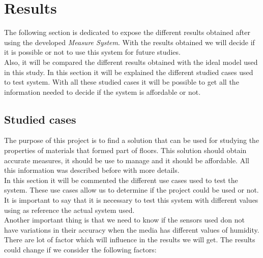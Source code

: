 
\chapter{Results}

The following section is dedicated to expose the different results obtained after using the developed \textit{Measure System}. With the results obtained we will decide if it is possible or not to use this system for future studies.\\

Also, it will be compared the different results obtained with the ideal model used in this study. In this section it will be explained the different studied cases used to test system. With all these studied cases it will be possible to get all the information needed to decide if the system is affordable or not.

\section{Studied cases}

The purpose of this project is to find a solution that can be used for studying the properties of materials that formed part of floors. This solution should obtain accurate measures, it should be use to manage and it should be affordable. All this information was described before with more details.\\

In this section it will be commented the different use cases used to test the system. These use cases allow us to determine if the project could be used or not. It is important to say that it is necessary to test this system with different values using as reference the actual system used.\\

Another important thing is that we need to know if the sensors used don not have variations in their accuracy when the media has different values of humidity.\\

There are lot of factor which will influence in the results we will get. The results could change if we consider the following factors:

